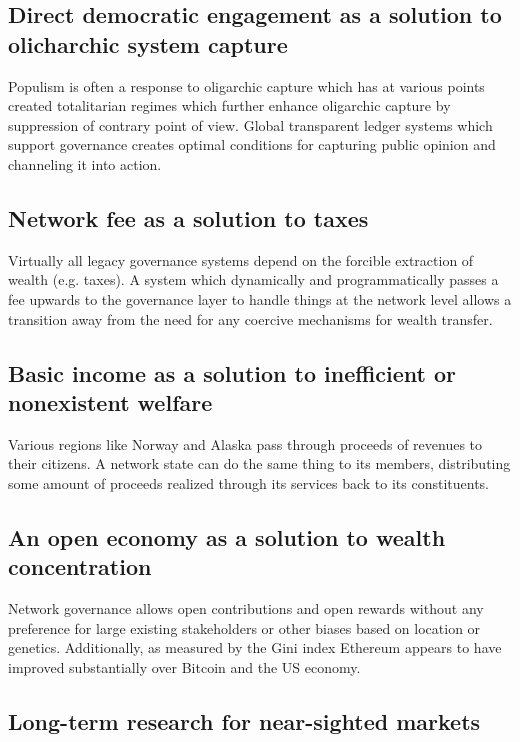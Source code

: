 \documentclass{article}
\begin{document}
\subsection {Direct democratic engagement as a solution to olicharchic system capture }

Populism is often a response to oligarchic capture which has at various points created totalitarian regimes which further enhance oligarchic capture by suppression of contrary point of view. Global transparent ledger systems which support governance creates optimal conditions for capturing public opinion and channeling it into action.

\subsection {Network fee as a solution to taxes}

Virtually all legacy governance systems depend on the forcible extraction of wealth (e.g. taxes). A system which dynamically and programmatically passes a fee upwards to the governance layer to handle things at the network level allows a transition away from  the need for any coercive mechanisms for wealth transfer.

\subsection {Basic income as a solution to inefficient or nonexistent welfare}

Various regions like Norway and Alaska pass through proceeds of revenues to their citizens. A network state can do the same thing to its members, distributing some amount of proceeds realized through its services back to its constituents.

\subsection {An open economy as a solution to wealth concentration}

Network governance allows open contributions and open rewards without any preference for large existing stakeholders or other biases based on location or genetics. Additionally, as measured by the Gini index Ethereum appears to have improved substantially over Bitcoin and the US economy. \cite{buterinethersale}


\subsection {Long-term research for near-sighted markets}
\end{document}
